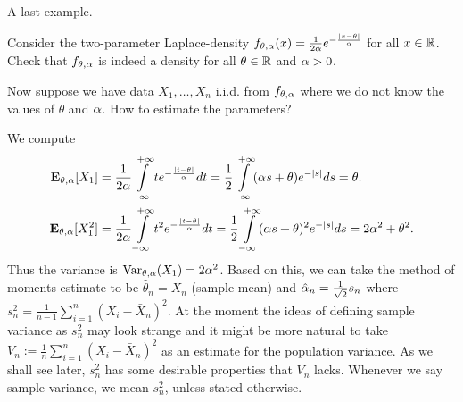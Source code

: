 \documentclass[preprint,  11pt]{amsart}
\begin{document}
A last example.
\begin{example} Consider the two-parameter Laplace-density $f_{\theta,\alpha}(x)=\frac{1}{2\alpha}e^{-\frac{|x-\theta|}{\alpha}}$ for all $x\in \mathbb{R}$.  Check that $f_{\theta,\alpha}$ is indeed a density for all $\theta\in \mathbb{R}$ and $\alpha>0$.

Now suppose we have data $X_{1},\ldots ,X_{n}$ i.i.d. from $f_{\theta,\alpha}$ where we do not know the values of $\theta$ and $\alpha$. How to estimate the parameters?

 We compute
\begin{align*}
\mathbf{E}_{\theta,\alpha}[X_{1}]&=\frac{1}{2\alpha}\int\limits_{-\infty}^{+\infty}te^{-\frac{|t-\theta|}{\alpha}}dt = \frac{1}{2}\int\limits_{-\infty}^{+\infty}(\alpha s+\theta) e^{-|s|}ds = \theta.\\
\mathbf{E}_{\theta,\alpha}[X_{1}^{2}]&=\frac{1}{2\alpha}\int\limits_{-\infty}^{+\infty}t^{2}e^{-\frac{|t-\theta|}{\alpha}}dt = \frac{1}{2}\int\limits_{-\infty}^{+\infty}(\alpha s+\theta)^{2} e^{-|s|}ds = 2\alpha^{2}+\theta^{2}.
\end{align*}
Thus the variance is $\mbox{Var}_{\theta,\alpha}(X_{1})=2\alpha^{2}$. Based on this, we can take the method of moments estimate to be $\hat{\theta}_{n}=\bar{X}_{n}$ (sample mean) and $\hat{\alpha}_{n}=\frac{1}{\sqrt{2}}s_{n}$ where $s_{n}^{2}=\frac{1}{n-1}\sum_{i=1}^{n}(X_{i}-\bar{X}_{n})^{2}$. At the moment the ideas of defining sample variance as $s_{n}^{2}$ may look strange and it might be more natural to take $V_{n}:=\frac{1}{n}\sum_{i=1}^{n}(X_{i}-\bar{X}_{n})^{2}$ as an estimate for the population variance. As we shall see later, $s_{n}^{2}$ has some desirable properties that $V_{n}$ lacks. Whenever we say sample variance, we mean $s_{n}^{2}$, unless stated otherwise.


\end{example}
\end{document}
